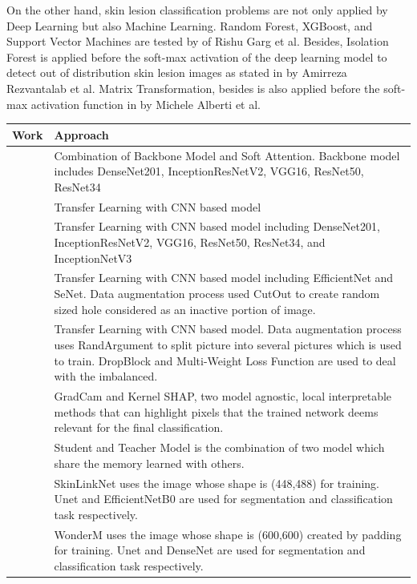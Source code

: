 \documentclass[sensors,article,submit,pdftex,moreauthors]{Definitions/mdpi}
\begin{document}
On the other hand, skin lesion classification problems are not only applied by Deep Learning but also Machine Learning. Random Forest, XGBoost, and Support Vector Machines are tested by \cite{03798} of Rishu Garg et al. Besides, Isolation Forest is applied before the soft-max activation of the deep learning model to detect out of distribution skin lesion images as stated in\cite{10348} by Amirreza Rezvantalab et al. Matrix Transformation, besides is also applied before the soft-max activation function in \cite{05045} by Michele Alberti et al. 
\FloatBarrier
\begin{table}[ht]
	\centering
	\begin{tabular}{|p{1cm}|p{12.5cm}|}
		\hline
		Work & Approach \\ 
		\hline
		\cite{03358} & Combination of Backbone Model and Soft Attention. Backbone model includes DenseNet201, InceptionResNetV2, VGG16, ResNet50, ResNet34\\
		\hline
		\cite{03798} & Transfer Learning with CNN based model\\
		\hline
		\cite{10348} & Transfer Learning with CNN based model including DenseNet201, InceptionResNetV2, VGG16, ResNet50, ResNet34, and InceptionNetV3\\
		\hline
		\cite{09418} & Transfer Learning with CNN based model including EfficientNet and SeNet. Data augmentation process used CutOut to create random sized hole considered as an inactive portion of image.\\
		\hline
		\cite{01284} & Transfer Learning with CNN based model. Data augmentation process uses RandArgument to split picture into several pictures which is used to train. DropBlock and Multi-Weight Loss Function are used to deal with the imbalanced.\\
		\hline
		\cite{06612} & GradCam and Kernel SHAP, two model agnostic, local interpretable methods that can highlight pixels that the trained network deems relevant for the final classification.\\
		\hline
		\cite{03225} & Student and Teacher Model is the combination of two model which share the memory learned with others. \\
		\hline
		\cite{12602} & SkinLinkNet uses the image whose shape is (448,488) for training. Unet and EfficientNetB0 are used for segmentation and classification task respectively.\\
		\hline
		\cite{03426} & WonderM uses the image whose shape is (600,600) created by padding for training. Unet and DenseNet are used for segmentation and classification task respectively.\\

\end{tabular}
\end{table}
\end{document}

